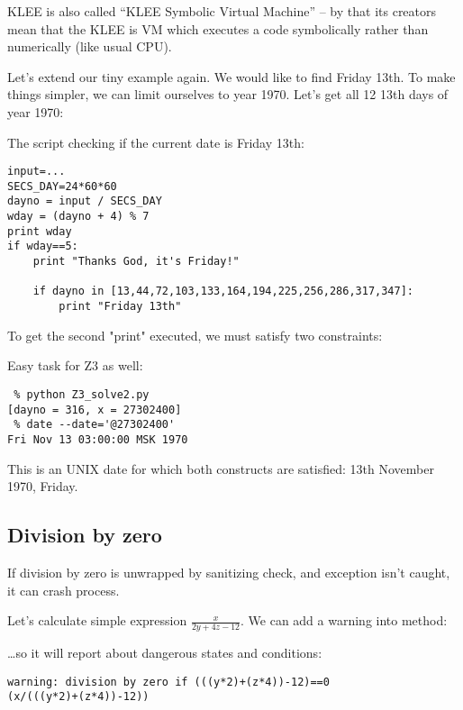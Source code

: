KLEE is also called ``KLEE Symbolic Virtual Machine'' -- by that its creators mean that the KLEE is \ac{VM} which executes a code symbolically rather than numerically (like usual \ac{CPU}).

Let's extend our tiny example again.
We would like to find Friday 13th. To make things simpler, we can limit ourselves to year 1970.
Let's get all 12 13th days of year 1970:



The script checking if the current date is Friday 13th:

\begin{lstlisting}
input=...
SECS_DAY=24*60*60
dayno = input / SECS_DAY
wday = (dayno + 4) % 7
print wday
if wday==5:
    print "Thanks God, it's Friday!"
 
    if dayno in [13,44,72,103,133,164,194,225,256,286,317,347]:
        print "Friday 13th"
\end{lstlisting}

To get the second "print" executed, we must satisfy two constraints:



Easy task for Z3 as well:

\begin{lstlisting}
 % python Z3_solve2.py
[dayno = 316, x = 27302400]
 % date --date='@27302400'
Fri Nov 13 03:00:00 MSK 1970
\end{lstlisting}

This is an UNIX date for which both constructs are satisfied: 13th November 1970, Friday.

\subsection{Division by zero}

If division by zero is unwrapped by sanitizing check, and exception isn't caught, it can crash process.

Let's calculate simple expression $\frac{x}{2y + 4z - 12}$.
We can add a warning into  method:



\dots so it will report about dangerous states and conditions:

\begin{lstlisting}
warning: division by zero if (((y*2)+(z*4))-12)==0
(x/(((y*2)+(z*4))-12))
\end{lstlisting}

